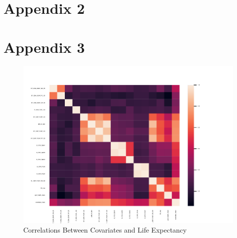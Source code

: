 \documentclass[12pt]{article}
\begin{document}
    \section*{Appendix 2}


        
        
        
        


    \section*{Appendix 3}

        \begin{figure}[h!]
            \centering
            \caption{Correlations Between Covariates and Life Expectancy}
            \label{LE_Health_Econ_Correlations}	
            \includegraphics[width=\linewidth,keepaspectratio=true]{../Output/Figures/LE_Health_Econ_Correlations_combined.pdf}
        \end{figure}
\end{document}
